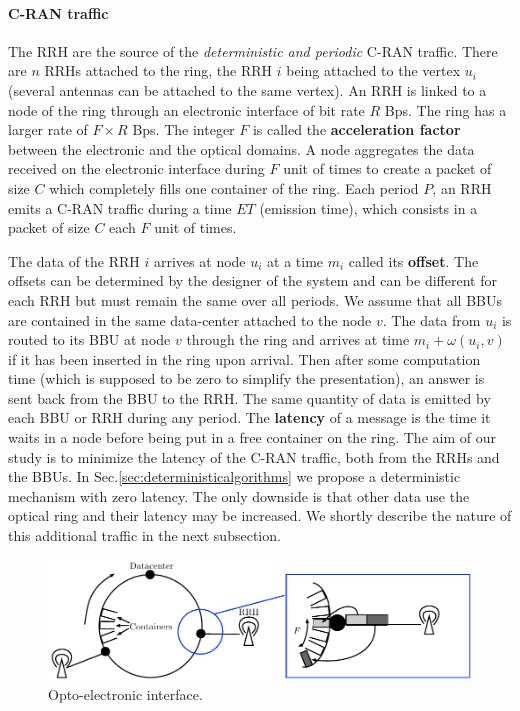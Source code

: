 \documentclass[]{algotel}
\begin{document}
   \paragraph{C-RAN traffic}
   
   The RRH are the source of the \emph{deterministic and periodic} C-RAN traffic.
   There are $n$ RRHs attached to the ring, the RRH $i$ being attached to the vertex $u_i$ (several antennas can be attached to the same vertex). An RRH is linked to a node of the ring through an electronic interface of bit rate $R$ Bps.
   The ring has a larger rate of $F\times R$ Bps. The integer $F$ is called the {\bf acceleration factor} between the electronic and the optical domains. A node aggregates the data received on the electronic interface during $F$ unit of times to create a packet of size $C$ which completely fills one container of the ring. Each period $P$, an RRH emits a C-RAN traffic 
   during a time $ET$ (emission time), which consists in a packet of size $C$ each $F$ unit of times.
   
   The data of the RRH $i$ arrives at node $u_i$ at a time $m_i$ called its {\bf offset}. The offsets can be determined 
   by the designer of the system and can be different for each RRH but must remain the same over all periods. We assume that all 
   BBUs are contained in the same data-center attached to the node $v$. The data from $u_i$ is routed to its BBU at node $v$ through the ring and arrives at time $m_i + \omega(u_i,v)$ if it has been inserted in the ring upon arrival. Then after some computation time (which is supposed to be zero to simplify the presentation), an answer is sent back from the BBU to the RRH. The same quantity of data is emitted by each BBU or RRH during any period.
   The {\bf latency} of a message is the time it waits in a node before being put in a free container on the ring.
   The aim of our study is to minimize the latency of the C-RAN traffic, both from the RRHs and the BBUs. 
   In Sec.\ref{sec:deterministicalgorithms} we propose a deterministic mechanism with zero latency. 
   The only downside is that other data use the optical ring and their latency may be increased. We shortly describe the
   nature of this additional traffic in the next subsection.
   
    
\begin{figure}[h!]
\begin{center}   

      \includegraphics[scale=0.8]{interface.pdf}
     \caption{Opto-electronic interface.}
     
\end{center}
  \end{figure}
    
\end{document}
